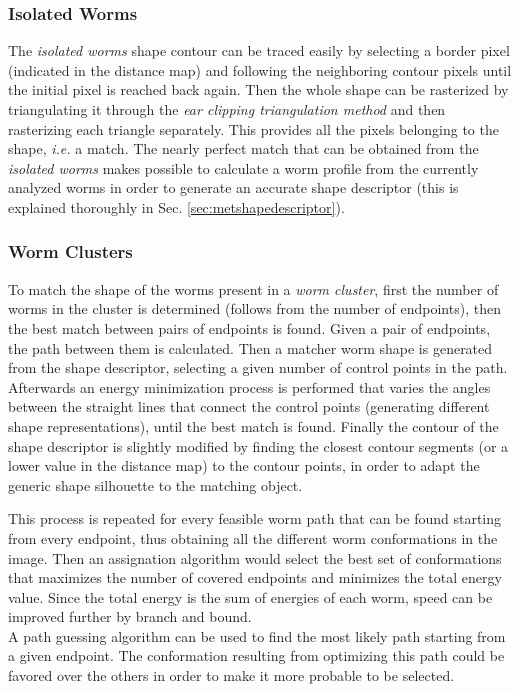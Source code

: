 \subsubsection*{Isolated Worms}
The \emph{isolated worms} shape contour can be traced easily by selecting a border pixel
(indicated in the distance map) and following the neighboring contour pixels until the
initial pixel is reached back again. Then the whole shape can be rasterized by 
triangulating it through the \emph{ear clipping triangulation method} and then rasterizing
each triangle separately. This provides all the pixels belonging to the shape, 
\emph{i.e.} a match.
The nearly perfect match that can be obtained from the \emph{isolated worms} makes 
possible to calculate a worm profile from the currently analyzed worms in order to
generate an accurate shape descriptor (this is explained thoroughly in 
Sec. \ref{sec:metshapedescriptor}).

\subsubsection*{Worm Clusters}
To match the shape of the worms present in a \emph{worm cluster}, first the number of 
worms in the cluster is determined (follows from the number of
endpoints), then the best match between pairs of endpoints is found. Given a pair of 
endpoints, the path between them is calculated. Then a matcher worm shape is generated
from the shape descriptor, selecting a given number of control points in the path.
Afterwards an energy minimization process is performed that varies the angles between the 
straight lines that connect the control points (generating different shape representations),
until the best match is found. Finally the contour of the shape descriptor is slightly 
modified by finding the closest contour segments (or a lower value in the distance map)
to the contour points, in order to adapt the generic shape silhouette to 
the matching object. 

This process is repeated for every feasible worm path that can be found starting from
every endpoint, thus obtaining all the different worm conformations in the image.
Then an assignation algorithm would select the best set of conformations that maximizes
the number of covered endpoints and minimizes the total energy value. 
Since the total energy is the sum of energies of each worm, speed can be improved further 
by branch and bound.\\
A path guessing algorithm can be used to find the most likely path 
starting from a given endpoint. The conformation resulting from 
optimizing this path could be favored over the others in order to make
it more probable to be selected.\\

